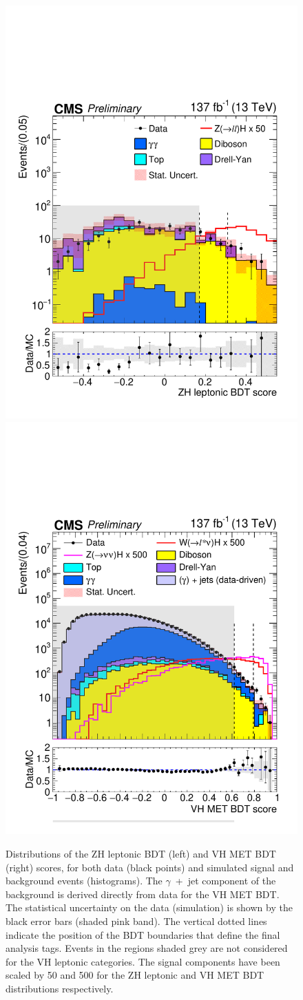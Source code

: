 \begin{figure}[hptb]
  \centering
  \includegraphics[width=.49\textwidth]{Figures/hgg_overview/ZH_LEPTONIC_BDT.pdf}
  \hfill
  \includegraphics[width=.49\textwidth]{Figures/hgg_overview/VH_MET_BDT.pdf}
  \caption[Output scores of two discriminants used for the VH leptonic production mode categories]
  {
    Distributions of the ZH leptonic BDT (left) and VH MET BDT (right) scores, for both data (black points) and simulated signal and background events (histograms). The $\gamma$~+~jet component of the background is derived directly from data for the VH MET BDT. The statistical uncertainty on the data (simulation) is shown by the black error bars (shaded pink band). The vertical dotted lines indicate the position of the BDT boundaries that define the final analysis tags. Events in the regions shaded grey are not considered for the VH leptonic categories. The signal components have been scaled by 50 and 500 for the ZH leptonic and VH MET BDT distributions respectively.
  }
  \label{fig:categorisation_vhlep}
\end{figure}

